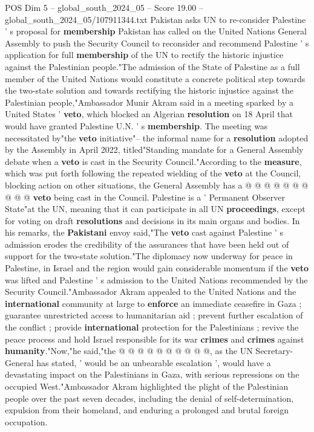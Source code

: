 \begin{textsample}{POS Dim 5 – global\_south\_2024\_05 – Score 19.00 – global\_south\_2024\_05/107911344.txt}  \label{ex:f5_pos_071}
Pakistan asks UN to re-consider Palestine ' s proposal for \textbf{membership} Pakistan has called on the United Nations General Assembly to push the Security Council to reconsider and recommend Palestine ' s application for full \textbf{membership} of the UN to rectify the historic injustice against the Palestinian people."The admission of the State of Palestine as a full member of the United Nations would constitute a concrete political step towards the two-state solution and towards rectifying the historic injustice against the Palestinian people,"Ambassador Munir Akram said in a meeting sparked by a United States ' \textbf{veto}, which blocked an Algerian \textbf{resolution} on 18 April that would have granted Palestine U.N. ' s \textbf{membership}.
The meeting was necessitated by"the \textbf{veto} initiative"-- the informal name for a \textbf{resolution} adopted by the Assembly in April 2022, titled"Standing mandate for a General Assembly debate when a \textbf{veto} is cast in the Security Council."According to the \textbf{measure}, which was put forth following the repeated wielding of the \textbf{veto} at the Council, blocking action on other situations, the General Assembly has a @ @ @ @ @ @ @ @ @ @ \textbf{veto} being cast in the Council.
Palestine is a ' Permanent Observer State"at the UN, meaning that it can participate in all UN \textbf{proceedings}, except for voting on draft \textbf{resolutions} and decisions in its main organs and bodies.
In his remarks, the \textbf{Pakistani} envoy said,"The \textbf{veto} cast against Palestine ' s admission erodes the credibility of the assurances that have been held out of support for the two-state solution."The diplomacy now underway for peace in Palestine, in Israel and the region would gain considerable momentum if the \textbf{veto} was lifted and Palestine ' s admission to the United Nations recommended by the Security Council."Ambassador Akram appealed to the United Nations and the \textbf{international} community at large to \textbf{enforce} an immediate ceasefire in Gaza ; guarantee unrestricted access to humanitarian aid ; prevent further escalation of the conflict ; provide \textbf{international} protection for the Palestinians ; revive the peace process and hold Israel responsible for its war \textbf{crimes} and \textbf{crimes} against \textbf{humanity}."Now,"he said,"the @ @ @ @ @ @ @ @ @ @, as the UN Secretary-General has stated, ' would be an unbearable escalation ', would have a devastating impact on the Palestinians in Gaza, with serious repressions on the occupied West."Ambassador Akram highlighted the plight of the Palestinian people over the past seven decades, including the denial of self-determination, expulsion from their homeland, and enduring a prolonged and brutal foreign occupation.

\end{textsample}
